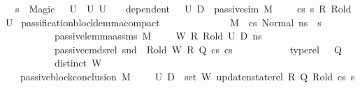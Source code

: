 \begin{isabellebody}
\ \ {\isacharparenleft}{\kern0pt}s{\isacharprime}{\kern0pt}\ {\isasymnoteq}\ Magic\ {\isasymlongrightarrow}\ {\isacharparenleft}{\kern0pt}{\isasymexists}\ U{}\ {\isasymsubseteq}\ U{}{\isachardot}{\kern0pt}\ U{}\ {\isasymnoteq}\ {\isacharbraceleft}{\kern0pt}{\isacharbraceright}{\kern0pt}\ {\isasymand}\ dependent\ {\isasymLambda}{\isacharprime}{\kern0pt}\ {\isasymOmega}\ U{}\ D{}\ {\isasymand}\ passive{\isacharunderscore}{\kern0pt}sim\ M\ {\isasymLambda}\ {\isasymLambda}{\isacharprime}{\kern0pt}\ {\isasymGamma}\ {\isasymOmega}\ cs{}\ s{\isacharprime}{\kern0pt}\ R\ R{\isacharunderscore}{\kern0pt}old\ U{}{\isacharparenright}{\kern0pt}{\isacharparenright}{\kern0pt}{\isachardoublequoteclose}\isanewline
\isanewline
{}\isamarkupfalse%
\ passification{\isacharunderscore}{\kern0pt}block{\isacharunderscore}{\kern0pt}lemma{\isacharunderscore}{\kern0pt}compact{\isacharcolon}{\kern0pt}\isanewline
\ \ \ \isanewline
\ \ \ \ \ \ \ \ \ \ {\isachardoublequoteopen}M{\isacharcomma}{\kern0pt}{\isasymLambda}{\isacharcomma}{\kern0pt}{\isasymGamma}{\isacharcomma}{\kern0pt}{\isasymOmega}\ {\isasymturnstile}\ {\isasymlangle}cs{}{\isacharcomma}{\kern0pt}\ Normal\ ns{\isasymrangle}\ {\isacharbrackleft}{\kern0pt}{\isasymrightarrow}{\isacharbrackright}{\kern0pt}\ s{\isacharprime}{\kern0pt}{\isachardoublequoteclose}\isanewline
\ \ \ \ \ \ \ \ \ \ {\isachardoublequoteopen}passive{\isacharunderscore}{\kern0pt}lemma{\isacharunderscore}{\kern0pt}assms\ M\ {\isasymLambda}\ {\isasymLambda}{\isacharprime}{\kern0pt}\ {\isasymGamma}\ {\isasymOmega}\ W\ R\ R{\isacharunderscore}{\kern0pt}old\ U{}\ D{}\ ns{\isachardoublequoteclose}\ \isanewline
\ \ \ \ \ \ \ \ \ \ {\isachardoublequoteopen}passive{\isacharunderscore}{\kern0pt}cmds{\isacharunderscore}{\kern0pt}rel\ {\isacharparenleft}{\kern0pt}snd\ {\isasymLambda}{\isacharparenright}{\kern0pt}\ R{\isacharunderscore}{\kern0pt}old\ W\ R\ Q\ cs{}\ cs{}{\isachardoublequoteclose}\ \isanewline
\ \ \ \ \ \ \ \ \ \ {\isachardoublequoteopen}type{\isacharunderscore}{\kern0pt}rel\ {\isasymLambda}\ {\isasymLambda}{\isacharprime}{\kern0pt}\ Q{\isachardoublequoteclose}\ \isanewline
\ \ \ \ \ \ \ \ \ \ {\isachardoublequoteopen}distinct\ W{\isachardoublequoteclose}\isanewline
\ \ \ {\isachardoublequoteopen}passive{\isacharunderscore}{\kern0pt}block{\isacharunderscore}{\kern0pt}conclusion\ M\ {\isasymLambda}\ {\isasymLambda}{\isacharprime}{\kern0pt}\ {\isasymGamma}\ {\isasymOmega}\ U{}\ {\isacharparenleft}{\kern0pt}D{}\ {\isasymunion}\ {\isacharparenleft}{\kern0pt}set\ W{\isacharparenright}{\kern0pt}{\isacharparenright}{\kern0pt}\ {\isacharparenleft}{\kern0pt}update{\isacharunderscore}{\kern0pt}nstate{\isacharunderscore}{\kern0pt}rel\ R\ Q{\isacharparenright}{\kern0pt}\ R{\isacharunderscore}{\kern0pt}old\ cs{}\ s{\isacharprime}{\kern0pt}{\isachardoublequoteclose}\isanewline

\end{isabellebody}

